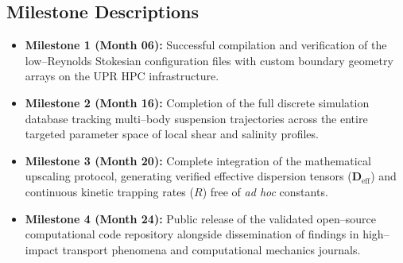 \subsection{Milestone Descriptions}
\begin{itemize}
    \item \textbf{Milestone 1 (Month 06):} Successful compilation and verification of the low--Reynolds Stokesian configuration files with custom boundary geometry arrays on the UPR HPC infrastructure.
    \item \textbf{Milestone 2 (Month 16):} Completion of the full discrete simulation database tracking multi--body suspension trajectories across the entire targeted parameter space of local shear and salinity profiles.
    \item \textbf{Milestone 3 (Month 20):} Complete integration of the mathematical upscaling protocol, generating verified effective dispersion tensors ($\bm{D}_{\text{eff}}$) and continuous kinetic trapping rates ($R$) free of \emph{ad hoc} constants.
    \item \textbf{Milestone 4 (Month 24):} Public release of the validated open--source computational code repository alongside dissemination of findings in high--impact transport phenomena and computational mechanics journals.
\end{itemize}
